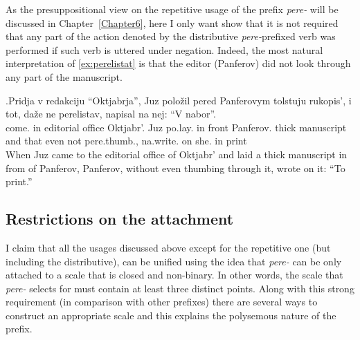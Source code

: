 As the presuppositional view on the repetitive usage of the prefix \textit{pere-} will be discussed in Chapter~\ref{Chapter6}, here I only want show that it is not required that any part of the action denoted by the distributive \textit{pere-}prefixed verb was performed if such verb is uttered under negation. Indeed, the most natural interpretation of \ref{ex:perelistat} is that the editor (Panferov) did not look through any part of the manuscript.

\exg.\label{ex:perelistat}Pridja v redakciju ``Oktjabrja'', Juz polo\v{z}il pered Panferovym tolstuju rukopis', i tot, da\v{z}e ne perelistav, napisal na nej: ``V nabor''.\\
come. in {editorial office} Oktjabr'. Juz po.lay. {in front} Panferov. thick manuscript and that even not pere.thumb., na.write. on she. in 	print\\
\vspace{0.5em}
When Juz came to the editorial office of Oktjabr' and laid a thick manuscript in from of Panferov, Panferov, without even thumbing through it, wrote on it: ``To print.''




\subsection{Restrictions on the attachment}
I claim that all the usages discussed above except for the repetitive one (but including the distributive), can be unified using the idea that \textit{pere-} can be only attached to a scale that is closed and non-binary. In other words, the scale that \textit{pere-} selects for must contain at least three distinct points. Along with this strong requirement (in comparison with other prefixes) there are several ways to construct an appropriate scale and this explains the polysemous nature of the prefix. 

